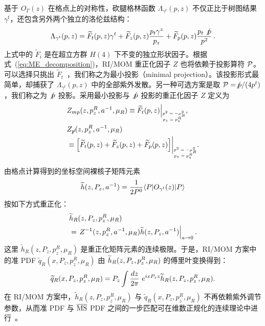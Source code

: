 基于 $O_\Gamma(z)$ 在格点上的对称性，砍腿格林函数 $\Lambda_{\gamma^t}(p,z)$ 不仅正比于树图结果 $\gamma^t$，还包含另外两个独立的洛伦兹结构：
\begin{equation}\label{eq:ME_decomposition}
\Lambda_{\gamma^t}(p,z)=\widetilde{F}_t(p,z) \gamma^t  + \widetilde{F}_{z}(p,z)\frac{p_t\gamma^z}{p_z} +\widetilde{F}_p(p,z)\frac{p_t\slashed{p}}{p^2}\,.
\end{equation}
上式中的 $\widetilde{F}_i$ 是在超立方群 $H(4)$ 下不变的独立形状因子。根据式~(\ref{eq:ME_decomposition})，RI/MOM 重正化因子 $Z$ 也将依赖于投影算符 ${\cal P}$。可以选择只挑出 $\widetilde{F}_t$~\cite{Stewart:2017tvs}，我们称之为最小投影（minimal projection）。该投影形式最简单，却捕获了 $\Lambda_{\gamma^t}(p,z)$ 中的全部紫外发散。另一种可选方案是取 ${\cal P} = \slashed p/(4p^t)$，我们称之为 $\slashed p$ 投影。采用最小投影与 $\slashed p$ 投影的重正化因子 $Z$ 定义为
\begin{align}\label{eq:def_renorm}
&Z_{mp}(z, p^R_z, a^{-1}, \mu_R)\equiv \widetilde{F}_t(p,z)\Big|_{\tiny\begin{matrix}p^2=-\mu_R^2 \\ \!\!\!\!p_z=p^R_z\end{matrix}},\\
&Z_{\slashed{p}}(z, p^R_z, a^{-1}, \mu_R)\nonumber\\
&\equiv \Big[\widetilde{F}_t(p,z)+\widetilde{F}_z(p,z)+\widetilde{F}_p(p,z)\Big]\bigg|_{\tiny\begin{matrix}p^2=-\mu_R^2 \\ \!\!\!\!p_z=p^R_z\end{matrix}}.
\end{align}

由格点计算得到的坐标空间裸核子矩阵元素
\begin{align}
\widetilde{h}(z,P_z,a^{-1}) = {1\over 2P^0} \langle P |O_{\gamma^t}(z)| P \rangle \nn
\end{align}
按如下方式重正化：
\begin{align} \label{eq:rimomh}
&\widetilde{h}_R(z,P_z, p^R_z,\mu_R)\nn\\
&=\left.Z^{-1}(z,p^R_z,a^{-1},\mu_{\tiny R})\widetilde{h}(z,P_z,a^{-1})\right|_{a\to 0} .
\end{align}
这里 $\widetilde{h}_R(z,P_z, p^R_z,\mu_R)$ 是重正化矩阵元素的连续极限。于是，RI/MOM 方案中的准 PDF $\widetilde{q}_R(x,P_z,p^R_z,\mu_R)$ 由 $\widetilde{h}_R(z,P_z, p^R_z,\mu_{\tiny R})$ 的傅里叶变换得到：
\begin{align}
\widetilde{q}_R(x,P_z, p^R_z,\mu_R) = P_z\int {dz\over 2\pi}\ e^{ix P_zz}\widetilde{h}_R(z,P_z, p^R_z,\mu_R).\nn\\
\end{align}
在 RI/MOM 方案中，$\widetilde{h}_R(z,P_z, p^R_z,\mu_R)$ 与 $\widetilde{q}_R(x,P_z, p^R_z,\mu_R)$ 不再依赖紫外调节参数，从而准 PDF 与 $\overline{\rm MS}$ PDF 之间的一步匹配可在维数正规化的连续理论中进行~\cite{Stewart:2017tvs}。

